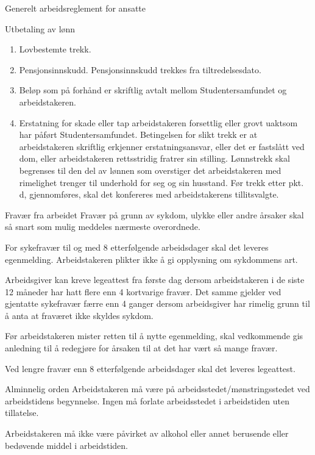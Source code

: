 \begin{lovkapittel}{Generelt arbeidsreglement for ansatte}
\begin{lovparagraf}{Utbetaling av lønn}
  \begin{enumerate}
	\item Lovbestemte trekk.
  \item Pensjonsinnskudd. Pensjonsinnskudd trekkes fra tiltredelsesdato.
  \item Beløp som på forhånd er skriftlig avtalt mellom Studentersamfundet og arbeidstakeren.
  \item Erstatning for skade eller tap arbeidstakeren forsettlig eller grovt uaktsom har påført Studentersamfundet. Betingelsen for slikt trekk er at arbeidstakeren skriftlig erkjenner erstatningsansvar, eller det er fastslått ved dom, eller arbeidstakeren rettsstridig fratrer sin stilling. Lønnstrekk skal begrenses til den del av lønnen som overstiger det arbeidstakeren med rimelighet trenger til underhold for seg og sin husstand. Før trekk etter pkt. d, gjennomføres, skal det konfereres med arbeidstakerens tillitsvalgte.  
  \end{enumerate} 

  \end{lovparagraf}

  \begin{lovparagraf}{Fravær fra arbeidet}
Fravær på grunn av sykdom, ulykke eller andre årsaker skal så snart som mulig meddeles nærmeste overordnede.

For sykefravær til og med 8 etterfølgende arbeidsdager skal det leveres egenmelding. Arbeidstakeren plikter ikke å gi
opplysning om sykdommens art.

Arbeidsgiver kan kreve legeattest fra første dag dersom arbeidstakeren i de siste 12 måneder har hatt flere enn 4
kortvarige fravær. Det samme gjelder ved gjentatte sykefravær færre enn 4 ganger dersom arbeidsgiver har rimelig
grunn til å anta at fraværet ikke skyldes sykdom.

Før arbeidstakeren mister retten til å nytte egenmelding, skal vedkommende gis anledning til å redegjøre for årsaken
til at det har vært så mange fravær.

Ved lengre fravær enn 8 etterfølgende arbeidsdager skal det leveres legeattest.  \end{lovparagraf}

  \begin{lovparagraf}{Alminnelig orden}
Arbeidstakeren må være på arbeidsstedet/mønstringsstedet ved arbeidstidens begynnelse.
Ingen må forlate arbeidsstedet i arbeidstiden uten tillatelse.

Arbeidstakeren må ikke være påvirket av alkohol eller annet berusende eller bedøvende middel i arbeidstiden.
  \end{lovparagraf}


\end{lovkapittel}
